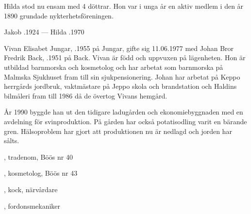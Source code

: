 Hilda stod nu ensam med 4 döttrar. Hon var i unga år en aktiv medlem i den år 1890 grundade nykterhetsföreningen.
\begin{jhchildren}
  \item {}
  \item {}
  \item {}
  \item {}
  \item {}
\end{jhchildren}

Jakob .1924  ---  Hilda .1970



%



%
Vivan Elisabet Jungar, .1955 på Jungar, gifte sig 11.06.1977 med Johan Bror Fredrik Back, .1951 på Back. Vivan är född och uppvuxen på lägenheten. Hon är utbildad barnmorska och kosmetolog och har arbetat som barnmorska på Malmska Sjukhuset fram till sin sjukpensionering. Johan har arbetat på Keppo herrgårds jordbruk, vaktmästare på Jeppo skola och brandstation och Haldins bilmåleri fram till 1986 då de övertog Vivans hemgård.

År 1990 byggde han ut den tidigare ladugården och ekonomiebyggnaden med en avdelning för svinproduktion. På gården har också potatisodling varit en bärande gren. Hälsoproblem har gjort att produktionen nu är nedlagd och jorden har sålts.
\begin{jhchildren}
  \item {}, tradenom, Böös nr 40
  \item {}, kosmetolog, Böös nr 43
  \item {}, kock, närvårdare
  \item {}, fordonsmekaniker
\end{jhchildren}


